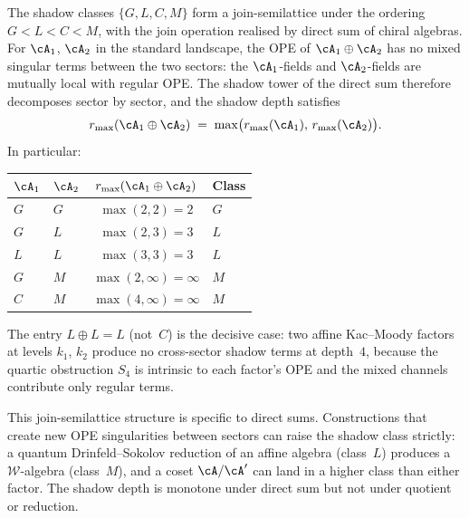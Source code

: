 \begin{remark}
\label{rem:shadow-class-direct-sum}

The shadow classes $\{G, L, C, M\}$ form a join-semilattice under
the ordering $G < L < C < M$, with the join operation realised by
direct sum of chiral algebras. For $\cA_1$, $\cA_2$ in the
standard landscape, the OPE of $\cA_1 \oplus \cA_2$ has no mixed
singular terms between the two sectors: the $\cA_1$-fields and
$\cA_2$-fields are mutually local with regular OPE. The shadow
tower of the direct sum therefore decomposes sector by sector, and
the shadow depth satisfies
\begin{equation}
\label{eq:shadow-depth-direct-sum}
 r_{\max}(\cA_1 \oplus \cA_2)
 \;=\;
 \max\bigl(r_{\max}(\cA_1),\, r_{\max}(\cA_2)\bigr).
\end{equation}
In particular:
\begin{center}
\renewcommand{\arraystretch}{1.3}
\begin{tabular}{@{}llcl@{}}
\toprule
$\cA_1$ & $\cA_2$ & $r_{\max}(\cA_1 \oplus \cA_2)$ & Class \\
\midrule
$G$ & $G$ & $\max(2,2) = 2$ & $G$ \\
$G$ & $L$ & $\max(2,3) = 3$ & $L$ \\
$L$ & $L$ & $\max(3,3) = 3$ & $L$ \\
$G$ & $M$ & $\max(2,\infty) = \infty$ & $M$ \\
$C$ & $M$ & $\max(4,\infty) = \infty$ & $M$ \\
\bottomrule
\end{tabular}
\end{center}
The entry $L \oplus L = L$ (not~$C$) is the decisive case: two
affine Kac--Moody factors at levels $k_1$, $k_2$ produce no
cross-sector shadow terms at depth~$4$, because the quartic
obstruction $S_4$ is intrinsic to each factor's OPE and the
mixed channels contribute only regular terms.

This join-semilattice structure is specific to direct sums.
Constructions that create new OPE singularities between
sectors can raise the shadow class strictly: a quantum
Drinfeld--Sokolov reduction of an affine algebra (class~$L$)
produces a $\mathcal{W}$-algebra (class~$M$), and a coset
$\cA / \cA'$ can land in a higher class than either factor.
The shadow depth is monotone under direct sum but not under
quotient or reduction.
\end{remark}


